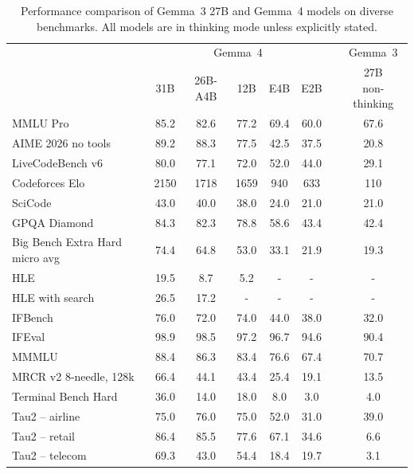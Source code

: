 \documentclass[11pt, a4paper, logo, twocolumn, copyright]{googledeepmind}
\begin{document}
\begin{table}[th!]
\centering
\begin{tabular}{@{}l ccccc c c@{}}
\toprule
& \multicolumn{5}{c}{Gemma~4} && Gemma~3 \\
\cmidrule{2-6}\cmidrule{8-8}
& 31B & 26B-A4B & 12B & E4B & E2B && \makecell{27B\\{\tiny non-thinking}} \\
\midrule
MMLU Pro \nocite{wang2024mmlu} & 85.2 & 82.6 & 77.2 & 69.4 & 60.0 && 67.6 \\
\midrule
AIME 2026 {\tiny no tools} & 89.2 & 88.3 & 77.5 & 42.5 & 37.5 && 20.8 \\
\midrule
LiveCodeBench v6 \nocite{jain2025livecodebench} & 80.0 & 77.1 & 72.0 & 52.0 & 44.0 && 29.1 \\
Codeforces {\tiny Elo} & 2150 & 1718 & 1659 & 940 & 633 && 110 \\
SciCode \nocite{tian2024scicode} & 43.0 & 40.0 & 38.0 & 24.0 & 21.0 && 21.0 \\
\midrule
GPQA Diamond \nocite{Rein2023GPQAAG} & 84.3 & 82.3 & 78.8 & 58.6 & 43.4 && 42.4 \\
\midrule
Big Bench Extra Hard {\tiny micro avg}\nocite{kazemi2025big} & 74.4 & 64.8 & 53.0 & 33.1 & 21.9 && 19.3 \\
\midrule
HLE \nocite{phan2025humanity} & 19.5 & 8.7 & 5.2 & - & - && - \\
HLE with search \nocite{center2026benchmark} & 26.5 & 17.2 & - & - & - && - \\
\midrule
IFBench \nocite{pyatkin2026generalizing} & 76.0 & 72.0 & 74.0 & 44.0 & 38.0 && 32.0 \\
IFEval \nocite{zhou2023instruction} & 98.9 & 98.5 & 97.2 & 96.7 & 94.6 && 90.4 \\
\midrule
MMMLU & 88.4 & 86.3 & 83.4 & 76.6 & 67.4 && 70.7 \\
\midrule
MRCR v2 {\tiny 8-needle, 128k} \nocite{vodrahalli2024michelangelo} & 66.4 & 44.1 & 43.4 & 25.4 & 19.1 && 13.5 \\
\midrule
Terminal Bench Hard \nocite{merrill2026terminal} & 36.0 & 14.0 & 18.0 & 8.0 & 3.0 && 4.0 \\
Tau2 -- airline \nocite{barres2025tau2} & 75.0 & 76.0 & 75.0 & 52.0 & 31.0 && 39.0 \\
Tau2 -- retail & 86.4 & 85.5 & 77.6 & 67.1 & 34.6 && 6.6 \\
Tau2 -- telecom & 69.3 & 43.0 & 54.4 & 18.4 & 19.7 && 3.1 \\
\bottomrule
\end{tabular}
\caption{Performance comparison of Gemma~3 27B and Gemma~4 models on diverse benchmarks. All models are in thinking mode unless explicitly stated.}
\label{tab:it_fs}
\end{table}
\end{document}

